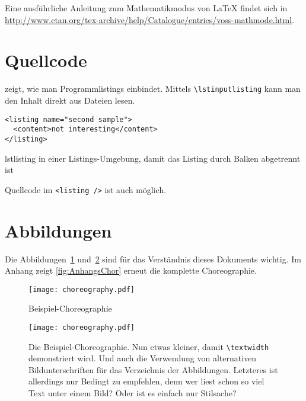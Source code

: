Eine ausführliche Anleitung zum Mathematikmodus von LaTeX findet sich in \url{http://www.ctan.org/tex-archive/help/Catalogue/entries/voss-mathmode.html}.

\section{Quellcode}
 zeigt, wie man Programmlistings einbindet.  Mittels \texttt{\textbackslash lstinputlisting} kann man den Inhalt direkt aus Dateien lesen.

\begin{Listing}
\begin{lstlisting}
<listing name="second sample">
  <content>not interesting</content>
</listing>
\end{lstlisting}
\caption{lstlisting in einer Listings-Umgebung, damit das Listing durch Balken abgetrennt ist}
\label{lst:ListingANDlstlisting}
\end{Listing}

Quellcode im \lstinline|<listing />| ist auch möglich.

\section{Abbildungen}
Die Abbildungen~\ref{fig:chor1} und~\ref{fig:chor2} sind für das Verständnis dieses Dokuments
wichtig. Im Anhang zeigt \vref{fig:AnhangsChor} erneut die komplette Choreographie.

\begin{figure}
  \begin{center}
    \texttt{[image: choreography.pdf]}
    \caption{Beispiel-Choreographie}
    \label{fig:chor1}
  \end{center}
\end{figure}

\begin{figure}
  \begin{center}
    \texttt{[image: choreography.pdf]}
    \caption[Beispiel-Choreographie]{Die Beispiel-Choreographie. Nun etwas kleiner, damit \texttt{\textbackslash textwidth} demonstriert wird. Und auch die Verwendung von alternativen Bildunterschriften für das Verzeichnis der Abbildungen. Letzteres ist allerdings nur Bedingt zu empfehlen, denn wer liest schon so viel Text unter einem Bild? Oder ist es einfach nur Stilsache?}
    \label{fig:chor2}
  \end{center}
\end{figure}

